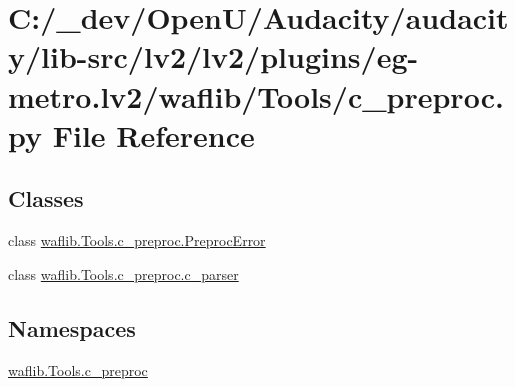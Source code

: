 \hypertarget{lv2_2plugins_2eg-metro_8lv2_2waflib_2_tools_2c__preproc_8py}{}\section{C\+:/\+\_\+dev/\+Open\+U/\+Audacity/audacity/lib-\/src/lv2/lv2/plugins/eg-\/metro.lv2/waflib/\+Tools/c\+\_\+preproc.py File Reference}
\label{lv2_2plugins_2eg-metro_8lv2_2waflib_2_tools_2c__preproc_8py}
\subsection*{Classes}
\begin{DoxyCompactItemize}
\item 
class \hyperlink{classwaflib_1_1_tools_1_1c__preproc_1_1_preproc_error}{waflib.\+Tools.\+c\+\_\+preproc.\+Preproc\+Error}
\item 
class \hyperlink{classwaflib_1_1_tools_1_1c__preproc_1_1c__parser}{waflib.\+Tools.\+c\+\_\+preproc.\+c\+\_\+parser}
\end{DoxyCompactItemize}
\subsection*{Namespaces}
\begin{DoxyCompactItemize}
\item 
 \hyperlink{namespacewaflib_1_1_tools_1_1c__preproc}{waflib.\+Tools.\+c\+\_\+preproc}
\end{DoxyCompactItemize}
